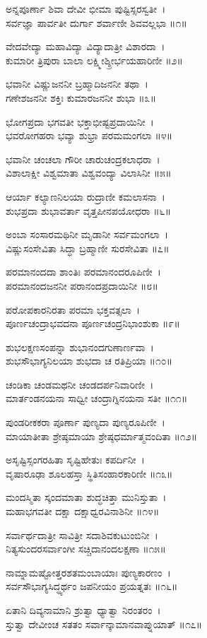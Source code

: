 ಅನ್ನಪೂರ್ಣಾ ಶಿವಾ ದೇವೀ ಭೀಮಾ ಪುಷ್ಟಿಸ್ಸರಸ್ವತೀ~।\\
ಸರ್ವಜ್ಞಾ ಪಾರ್ವತೀ ದುರ್ಗಾ ಶರ್ವಾಣೀ ಶಿವವಲ್ಲಭಾ ॥೧॥

ವೇದವೇದ್ಯಾ ಮಹಾವಿದ್ಯಾ ವಿದ್ಯಾದಾತ್ರೀ ವಿಶಾರದಾ~।\\
ಕುಮಾರೀ ತ್ರಿಪುರಾ ಬಾಲಾ ಲಕ್ಷ್ಮೀಶ್ಶ್ರೀರ್ಭಯಹಾರಿಣೀ ॥೨॥

ಭವಾನೀ ವಿಷ್ಣುಜನನೀ ಬ್ರಹ್ಮಾದಿಜನನೀ ತಥಾ~।\\
ಗಣೇಶಜನನೀ ಶಕ್ತಿಃ ಕುಮಾರಜನನೀ ಶುಭಾ ॥೩॥

ಭೋಗಪ್ರದಾ ಭಗವತೀ ಭಕ್ತಾಭೀಷ್ಟಪ್ರದಾಯಿನೀ~।\\
ಭವರೋಗಹರಾ ಭವ್ಯಾ ಶುಭ್ರಾ ಪರಮಮಂಗಲಾ ॥೪॥

ಭವಾನೀ ಚಂಚಲಾ ಗೌರೀ ಚಾರುಚಂದ್ರಕಲಾಧರಾ~।\\
ವಿಶಾಲಾಕ್ಷೀ ವಿಶ್ವಮಾತಾ ವಿಶ್ವವಂದ್ಯಾ ವಿಲಾಸಿನೀ ॥೫॥

ಆರ್ಯಾ ಕಲ್ಯಾಣನಿಲಯಾ ರುದ್ರಾಣೀ ಕಮಲಾಸನಾ~।\\
ಶುಭಪ್ರದಾ ಶುಭಾವರ್ತಾ ವೃತ್ತಪೀನಪಯೋಧರಾ ॥೬॥

ಅಂಬಾ ಸಂಸಾರಮಥಿನೀ ಮೃಡಾನೀ ಸರ್ವಮಂಗಲಾ~।\\
ವಿಷ್ಣುಸಂಸೇವಿತಾ ಸಿದ್ಧಾ ಬ್ರಹ್ಮಾಣೀ ಸುರಸೇವಿತಾ ॥೭॥

ಪರಮಾನಂದದಾ ಶಾಂತಿಃ ಪರಮಾನಂದರೂಪಿಣೀ~।\\
ಪರಮಾನಂದಜನನೀ ಪರಾನಂದಪ್ರದಾಯಿನೀ ॥೮॥

ಪರೋಪಕಾರನಿರತಾ ಪರಮಾ ಭಕ್ತವತ್ಸಲಾ~।\\
ಪೂರ್ಣಚಂದ್ರಾಭವದನಾ ಪೂರ್ಣಚಂದ್ರನಿಭಾಂಶುಕಾ ॥೯॥

ಶುಭಲಕ್ಷಣಸಂಪನ್ನಾ ಶುಭಾನಂದಗುಣಾರ್ಣವಾ~।\\
ಶುಭಸೌಭಾಗ್ಯನಿಲಯಾ ಶುಭದಾ ಚ ರತಿಪ್ರಿಯಾ ॥೧೦॥

ಚಂಡಿಕಾ ಚಂಡಮಥನೀ ಚಂಡದರ್ಪನಿವಾರಿಣೀ~।\\
ಮಾರ್ತಂಡನಯನಾ ಸಾಧ್ವೀ ಚಂದ್ರಾಗ್ನಿನಯನಾ ಸತೀ ॥೧೧॥

ಪುಂಡರೀಕಕರಾ ಪೂರ್ಣಾ ಪುಣ್ಯದಾ ಪುಣ್ಯರೂಪಿಣೀ~।\\
ಮಾಯಾತೀತಾ ಶ್ರೇಷ್ಠಮಾಯಾ ಶ್ರೇಷ್ಠಧರ್ಮಾತ್ಮವಂದಿತಾ ॥೧೨॥

ಅಸೃಷ್ಟಿಸ್ಸಂಗರಹಿತಾ ಸೃಷ್ಟಿಹೇತುಃ ಕಪರ್ದಿನೀ~।\\
ವೃಷಾರೂಢಾ ಶೂಲಹಸ್ತಾ ಸ್ಥಿತಿಸಂಹಾರಕಾರಿಣೀ ॥೧೩॥

ಮಂದಸ್ಮಿತಾ ಸ್ಕಂದಮಾತಾ ಶುದ್ಧಚಿತ್ತಾ ಮುನಿಸ್ತುತಾ~।\\
ಮಹಾಭಗವತೀ ದಕ್ಷಾ ದಕ್ಷಾಧ್ವರವಿನಾಶಿನೀ ॥೧೪॥

ಸರ್ವಾರ್ಥದಾತ್ರೀ ಸಾವಿತ್ರೀ ಸದಾಶಿವಕುಟುಂಬಿನೀ~।\\
ನಿತ್ಯಸುಂದರಸರ್ವಾಂಗೀ ಸಚ್ಚಿದಾನಂದಲಕ್ಷಣಾ ॥೧೫॥

ನಾಮ್ನಾಮಷ್ಟೋತ್ತರಶತಮಂಬಾಯಾಃ ಪುಣ್ಯಕಾರಣಂ~।\\
ಸರ್ವಸೌಭಾಗ್ಯಸಿದ್ಧ್ಯರ್ಥಂ ಜಪನೀಯಂ ಪ್ರಯತ್ನತಃ ॥೧೬॥

ಏತಾನಿ ದಿವ್ಯನಾಮಾನಿ ಶ್ರುತ್ವಾ ಧ್ಯಾತ್ವಾ ನಿರಂತರಂ~।\\
ಸ್ತುತ್ವಾ ದೇವೀಂಚ ಸತತಂ ಸರ್ವಾನ್ಕಾಮಾನವಾಪ್ನುಯಾತ್ ॥೧೭॥
